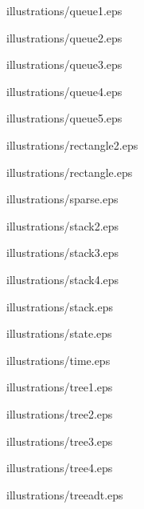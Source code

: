 \centerline{}

illustrations/queue1.eps

\centerline{}

illustrations/queue2.eps


illustrations/queue3.eps


illustrations/queue4.eps


illustrations/queue5.eps


illustrations/rectangle2.eps

\centerline{}

illustrations/rectangle.eps

\centerline{}

illustrations/sparse.eps

\centerline{}

illustrations/stack2.eps

\centerline{}

illustrations/stack3.eps

\centerline{}

illustrations/stack4.eps

\centerline{}

illustrations/stack.eps

\centerline{}

illustrations/state.eps

\centerline{}

illustrations/time.eps

\centerline{}

illustrations/tree1.eps

\centerline{}

illustrations/tree2.eps

\centerline{}

illustrations/tree3.eps


illustrations/tree4.eps

\centerline{}

illustrations/treeadt.eps


